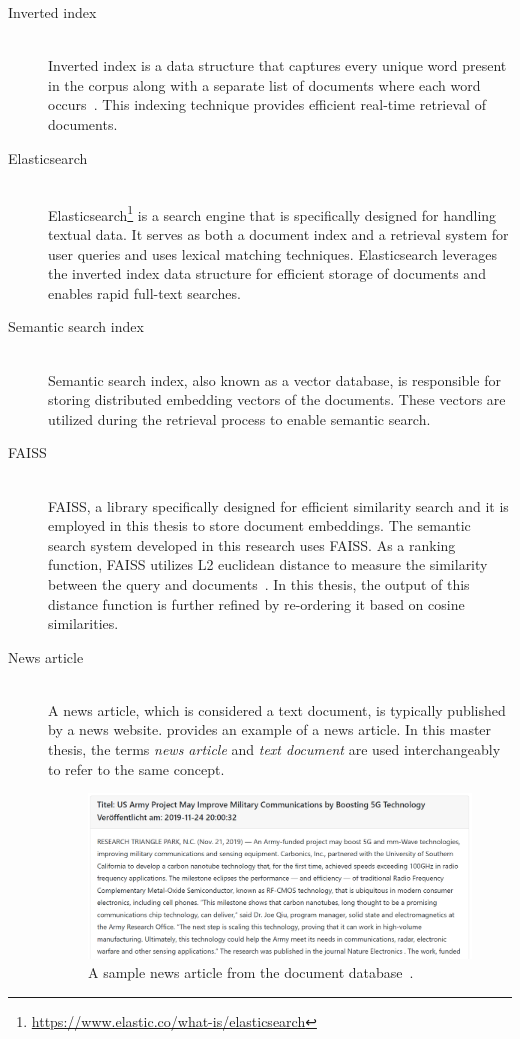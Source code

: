 \begin{description}
	\item[Inverted index] \hfill \\ Inverted index is a data structure that captures every unique word present in the corpus along with a separate list of documents where each word occurs~\cite{ziviani2000compression}. This indexing technique provides efficient real-time retrieval of documents.
	
	\item[Elasticsearch] \hfill \\ Elasticsearch\footnote{\url{https://www.elastic.co/what-is/elasticsearch}} is a search engine that is specifically designed for handling textual data. It serves as both a document index and a retrieval system for user queries and uses lexical matching techniques. Elasticsearch leverages the inverted index data structure for efficient storage of documents and enables rapid full-text searches.
	
	\item[Semantic search index] \hfill \\ Semantic search index, also known as a vector database, is responsible for storing distributed embedding vectors of the documents. These vectors are utilized during the retrieval process to enable semantic search.
	
	\item[FAISS] \hfill \\ \ac{FAISS}, a library specifically designed for efficient similarity search and it is employed in this thesis to store document embeddings. The semantic search system developed in this research uses \ac{FAISS}. As a ranking function, \ac{FAISS} utilizes L2 euclidean distance to measure the similarity between the query and documents~\cite{githubGitHubFacebookresearchfaiss}. In this thesis, the output of this distance function is further refined by re-ordering it based on cosine similarities.
	
	\item[News article] \hfill \\ A news article, which is considered a text document, is typically published by a news website.  provides an example of a news article. In this master thesis, the terms \emph{news article} and \emph{text document} are used interchangeably to refer to the same concept.
	
	\begin{figure}[h!]
		\centering
		\includegraphics[width=.8\textwidth]{images/mitera_screenshots/sample_news_article.PNG}
		\caption[News article example.]{A sample news article from the document database~\cite{sample_news_article}.\label{fig:sample_newsarticle}}
	\end{figure} 
	

\end{description}
